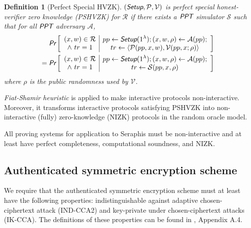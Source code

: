 \documentclass{article}
\theoremstyle{plain}
\newtheorem{definition}{Definition}[section]
\theoremstyle{remark}
\begin{document}
\begin{definition}[Perfect Special HVZK]
$(\emph{\textsf{Setup}}, \mathcal{P}, \mathcal{V})$ is perfect special honest-verifier zero knowledge (PSHVZK) for $\mathcal{R}$ if there exists a $\emph{\textsf{PPT}}$ simulator $\mathcal{S}$ such that for all $\emph{\textsf{PPT}}$ adversary $\mathcal{A}$,
\begin{align*}
\emph{\textsf{Pr}}\left[
\begin{array}{c|c}
    \begin{gathered}
        (x,w)\in\mathcal{R}\\
        \wedge\ tr = 1
    \end{gathered}
    &
    \begin{gathered}
        pp\leftarrow\emph{\textsf{Setup}}(1^{\lambda}); (x, w, \rho)\leftarrow\mathcal{A}(pp); \\
        tr\leftarrow\langle\mathcal{P}(pp,x,w), \mathcal{V}(pp,x; \rho)\rangle
    \end{gathered}
\end{array}
\right] \\
=\emph{\textsf{Pr}}\left[
\begin{array}{c|c}
    \begin{gathered}
        (x,w)\in\mathcal{R}\\
        \wedge\ tr = 1
    \end{gathered}
    &
    \begin{gathered}
        pp\leftarrow\emph{\textsf{Setup}}(1^{\lambda}); (x, w, \rho)\leftarrow\mathcal{A}(pp); \\
        tr\leftarrow\mathcal{S}(pp, x, \rho)
    \end{gathered}
\end{array}
\right]
\end{align*}
where $\rho$ is the public randomness used by $\mathcal{V}$.
\end{definition}

\textit{Fiat-Shamir heuristic} is applied to make interactive protocols non-interactive. Moreover, it transforms interactive protocols satisfying PSHVZK into non-interactive (fully) zero-knowledge (NIZK) protocols in the random oracle model.

All proving systems for application to Seraphis must be non-interactive and at least have perfect completeness,  computational soundness, and NIZK.

\subsection{Authenticated symmetric encryption scheme}\label{sec-symm}
We require that the authenticated symmetric encryption scheme must at least have the following properties: indistinguishable against adaptive chosen-ciphertext attack (IND-CCA2) and key-private under chosen-ciphertext attacks (IK-CCA). The definitions of these properties can be found in \cite{omniring}, Appendix A.4.
\end{document}
